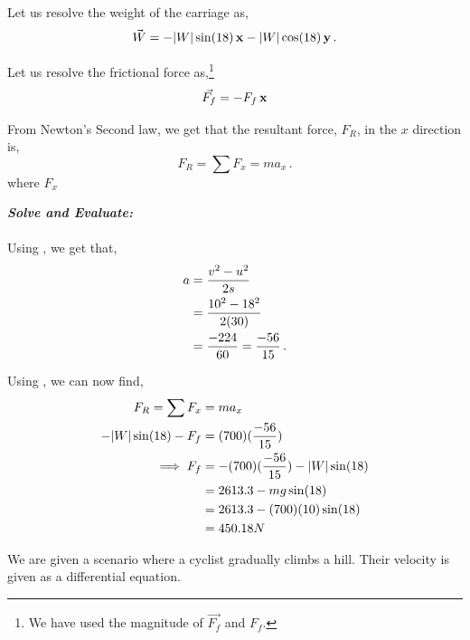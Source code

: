 \begin{subquestions}
Let us resolve the weight of the carriage as,
\begin{equation}
	\vec{W} = -|W|\sin(18)\,\mathbf{x}-|W|\cos(18)\,\mathbf{y} \,.
\end{equation}

Let us resolve the frictional force as,\footnote{We have used the magnitude of $\vec{F_f}$ and $F_f$.}
\begin{equation}
	\vec{F_f} = -F_f \,\mathbf{x}
\end{equation}

From Newton's Second law, we get that the resultant force, $F_R$, in the $x$ direction is,
\begin{equation}
	F_R = \sum F_x  = ma_x \,.	\label{2013:q5:Newton1}
\end{equation}
where $F_x$ 




\textbf{\textit{Solve and Evaluate:}} \\ \\
Using , we get that,
\begin{align}
	a & = \frac{v^2-u^2}{2s} \nonumber \\
	  & = \frac{10^2-18^2}{2(30)} \nonumber \\
	  & = \frac{-224}{60} = \frac{-56}{15} \,. 
\end{align}

Using , we can now find,
\begin{align}
	F_R = \sum F_x & = ma_x \nonumber \\
	      -|W|\sin(18) - F_f & = (700)(\frac{-56}{15}) \nonumber \\
	      \implies F_f & = -(700)(\frac{-56}{15})-|W|\sin(18) \nonumber \\
	                   & = 2613.3-mg\sin(18) \nonumber \\
	                   & = 2613.3-(700)(10)\sin(18) \nonumber \\
	                   & = 450.18N
\end{align}



\subquestion
We are given a scenario where a cyclist gradually climbs a hill. Their velocity is given as a differential equation.

\begin{subsubquestions}
	

\end{subsubquestions}
\end{subquestions}
